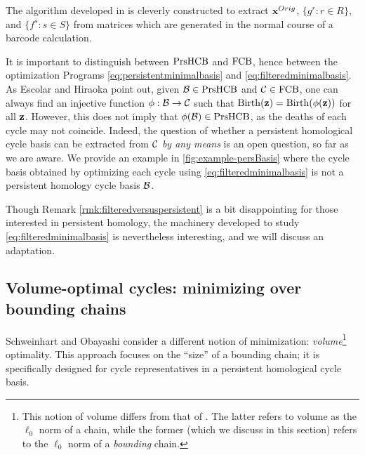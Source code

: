  

The algorithm developed in \cite{Escolar2016} is cleverly constructed to extract $\mathbf{x}^{Orig}$, $\{g^r : r \in R\}$, and $\{f^s : s \in S\}$ from matrices which are generated in the normal course of a barcode calculation.


\begin{remark}
\label{rmk:filteredversuspersistent}
It is important to distinguish between  $\mathrm{PrsHCB}$ and $\mathrm{FCB}$, hence between the optimization Programs \eqref{eq:persistentminimalbasis} and \eqref{eq:filteredminimalbasis}.  As Escolar and Hiraoka \cite{Escolar2016} point out, given $\mathcal B \in \mathrm{PrsHCB}$ and $\mathcal{C} \in \mathrm{FCB}$, one can always find an injective function $\phi: \mathcal B \to \mathcal{C}$ such that $\mathrm{Birth}({\mathbf z}) = \mathrm{Birth}(\phi({\mathbf z}))$ for all ${\mathbf z}$.  However, this does not imply that $\phi(\mathcal B) \in \mathrm{PrsHCB}$, as the deaths of each cycle may not coincide.  Indeed, the question of whether a persistent homological cycle basis can be extracted from $\mathcal{C}$ \emph{by any means} is an open question, so far as we are aware. We provide an example in \fig \ref{fig:example-persBasis} where the cycle basis obtained by optimizing each cycle using \pr \eqref{eq:filteredminimalbasis} is not a persistent homology cycle basis $\mathcal B$. 
\end{remark} 


Though Remark \ref{rmk:filteredversuspersistent} is a bit disappointing for those interested in persistent homology, the machinery developed to study \pr \eqref{eq:filteredminimalbasis} is nevertheless interesting, and we will discuss an adaptation.


\subsection{Volume-optimal cycles: minimizing over bounding chains}\label{sec:volume}

Schweinhart \cite{schweinhart2015statistical} and  Obayashi \cite{Obayashi2018} consider a different notion of minimization: \emph{volume}\footnote{This notion of volume differs from that of \cite{chenhardness}. The latter refers to volume as the $\ell_0$ norm of a chain, while the former (which we discuss in this section) refers to the $\ell_0$ norm of a \emph{bounding} chain.} optimality.  This approach focuses on the ``size'' of a bounding chain; it is specifically designed for cycle representatives in a persistent homological cycle basis.    


